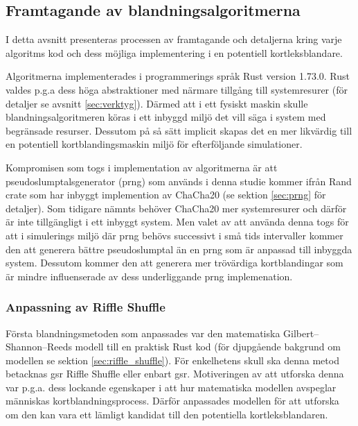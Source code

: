 \documentclass[swedish,a4paper]{article}
\begin{document}
\subsection{Framtagande av blandningsalgoritmerna}
I detta avsnitt presenteras processen av framtagande och 
detaljerna kring varje algoritms kod och dess
möjliga implementering i en potentiell kortleksblandare.

Algoritmerna implementerades i programmerings språk Rust version 1.73.0. Rust
valdes p.g.a dess höga abstraktioner med närmare tillgång till systemresurer
(för detaljer se avsnitt \ref{sec:verktyg}). Därmed att i ett fysiskt maskin
skulle blandningsalgoritmeren köras i ett inbyggd miljö det vill säga i system med
begränsade resurser. Dessutom på så sätt implicit skapas det en mer likvärdig till en
potentiell kortblandingsmaskin miljö för efterföljande simulationer. 

Kompromisen som togs i implementation av algoritmerna är att
pseudoslumptalsgenerator (\gls{prng}) som används i denna studie kommer ifrån
Rand \gls{crate} som har inbyggt implemention av ChaCha20 (se sektion
\ref{sec:prng} för detaljer). Som tidigare nämnts behöver ChaCha20 mer
systemresurer och därför är inte tillgängligt i ett inbyggt system. Men
valet av att använda denna togs för att i simulerings miljö där \gls{prng} behövs
successivt i små tids intervaller kommer den att generera bättre pseudoslumptal
än en \gls{prng} som är anpassad till inbyggda system. Dessutom kommer den att
generera mer trövärdiga kortblandingar som är mindre influenserade av dess
underliggande \gls{prng} implemenation. 

\subsubsection{Anpassning av Riffle Shuffle}
Första blandningsmetoden som anpassades var den matematiska
Gilbert–Shannon–Reeds modell till en praktisk Rust kod (för djupgående bakgrund
om modellen se sektion \ref{sec:riffle_shuffle}). För enkelhetens skull ska denna metod
betacknas \gls{gsr} Riffle Shuffle eller enbart \gls{gsr}. Motiveringen av att
utforska denna var  p.g.a. dess lockande egenskaper i att hur matematiska
modellen avspeglar människas kortblandningsprocess. Därför anpassades modellen för att
utforska om den kan vara ett lämligt kandidat till den potentiella
kortleksblandaren.
\end{document}
